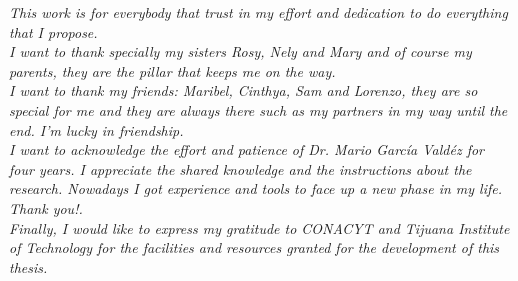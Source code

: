 


\textit{This work is for everybody that trust in my effort and
dedication to do everything that I propose.\\  I want to thank
specially my sisters Rosy, Nely and Mary and of course my parents,
they are the pillar that keeps me on the way.\\  I want to thank my
friends: Maribel, Cinthya, Sam and Lorenzo, they are so special for me
and they are always there such as my partners in my way until the end.
I’m lucky in friendship.\\  I want to acknowledge the effort and
patience of Dr. Mario Garc\'ia Vald\'ez for four years. I appreciate the
shared knowledge and the instructions about the research. Nowadays I
got experience and tools to face up a new phase in my life. Thank you!.\\  
Finally, I would like to express my gratitude to CONACYT and
Tijuana Institute of Technology for the facilities and resources
granted for the development of this thesis.}

